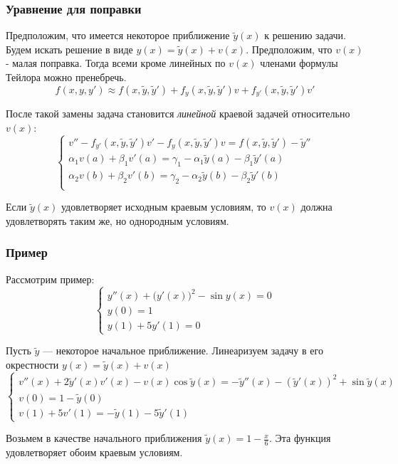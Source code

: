 \documentclass[professionalfonts,compress,unicode,aspectratio=169]{beamer}
\begin{document}
\begin{frame}\frametitle{Уравнение для поправки}
	Предположим, что имеется некоторое приближение $\tilde{y}(x)$ к решению
	задачи.
	Будем искать решение в виде $y(x) = \tilde{y}(x) + v(x)$. Предположим, что
	$v(x)$ - малая поправка. Тогда всеми кроме линейных по $v(x)$ членами
	формулы Тейлора можно пренебречь.
	\[
	f(x, y, y') \approx f(x, \tilde{y}, \tilde{y}') 
	+ f_{y}(x, \tilde{y}, \tilde{y}') v
	+ f_{y'}(x, \tilde{y}, \tilde{y}') v'
	\]

	После такой замены задача становится \emph{линейной} краевой задачей
	относительно $v(x)$:
	\[\begin{cases}
		v'' - f_{y'}(x,\tilde{y},\tilde{y}')v' - f_y(x,\tilde{y},\tilde{y}')v =
		f(x, \tilde{y}, \tilde{y}') - \tilde{y}''\\
		\alpha_1 v(a) + \beta_1 v'(a) = \gamma_1 - \alpha_1 \tilde{y}(a) -
		\beta_1 \tilde{y}'(a)\\
		\alpha_2 v(b) + \beta_2 v'(b) = \gamma_2 - \alpha_2 \tilde{y}(b) -
		\beta_2 \tilde{y}'(b)\\
	\end{cases}\]

	Если $\tilde{y}(x)$ удовлетворяет исходным краевым условиям, то $v(x)$
	должна удовлетворять таким же, но однородным условиям.
\end{frame}

\begin{frame}\frametitle{Пример}
	Рассмотрим пример:
	\[\begin{cases}
	y''(x) + \big(y'(x)\big)^2 - \sin y(x) = 0\\
	y(0) = 1\\
	y(1) + 5y'(1) = 0
	\end{cases}\]

	Пусть $\tilde{y}$ --- некоторое начальное приближение. Линеаризуем задачу в
	его окрестности $y(x) = \tilde{y}(x) + v(x)$
	\[\begin{cases}
	v''(x) 	+2 \tilde{y}'(x) v'(x) - v(x)\cos \tilde{y}(x) =
	-\tilde{y}''(x) -\left(\tilde{y}'(x)\right)^2 + \sin \tilde{y}(x)\\
	v(0) = 1 - \tilde{y}(0)\\
	v(1) + 5v'(1)= -\tilde{y}(1)-5\tilde{y}'(1)
	\end{cases}\]

	Возьмем в качестве начального приближения $\tilde{y}(x) = 1 - \frac{x}{6}$. Эта функция
	удовлетворяет обоим краевым условиям.
\end{frame}
\end{document}

